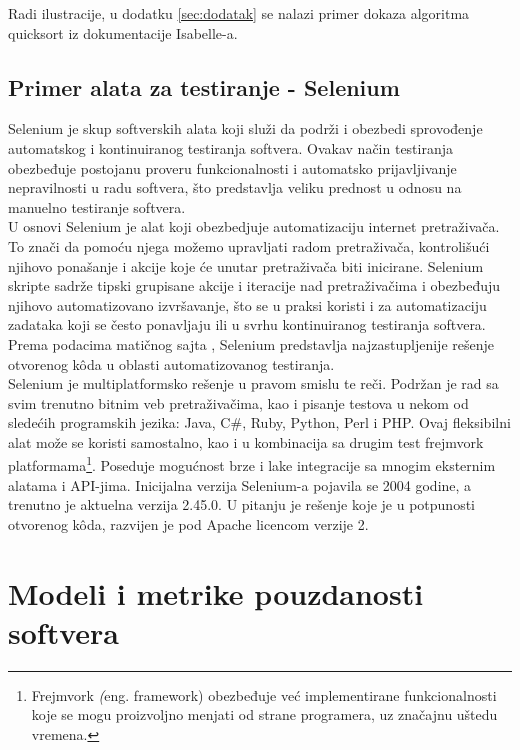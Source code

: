 \documentclass[a4paper]{article}
\begin{document}
Radi ilustracije, u dodatku \ref{sec:dodatak} se nalazi primer dokaza algoritma quicksort iz dokumentacije Isabelle-a.


\subsection{Primer alata za testiranje - Selenium}
\label{subsec:primer_alata}
Selenium je skup softverskih alata koji služi da podrži i obezbedi sprovođenje automatskog i kontinuiranog testiranja softvera. Ovakav način testiranja obezbeđuje postojanu proveru funkcionalnosti i automatsko prijavljivanje nepravilnosti u radu softvera, što predstavlja veliku prednost u odnosu na manuelno testiranje softvera.\\

U osnovi Selenium je alat koji obezbedjuje automatizaciju internet pretraživača. To znači da pomoću njega možemo upravljati radom pretraživača, kontrolišući njihovo ponašanje i akcije koje će unutar pretraživača biti inicirane. Selenium skripte sadrže tipski grupisane akcije i iteracije nad pretraživačima i obezbeđuju njihovo automatizovano izvršavanje, što se u praksi koristi i za automatizaciju zadataka koji se često ponavljaju ili u svrhu kontinuiranog testiranja softvera. Prema podacima matičnog sajta \cite{Selenium}, Selenium predstavlja najzastupljenije rešenje otvorenog  k\^{o}da u oblasti automatizovanog testiranja.\\

Selenium je multiplatformsko rešenje u pravom smislu te reči. Podržan je rad sa svim trenutno bitnim veb pretraživačima, kao i pisanje testova u nekom od sledećih programskih jezika: Java, C\#, Ruby, Python, Perl i PHP. Ovaj fleksibilni alat može se koristi samostalno, kao i u kombinacija sa drugim test frejmvork platformama\footnote{ Frejmvork \emph(eng. framework) obezbeđuje već implementirane funkcionalnosti koje se mogu proizvoljno menjati od strane programera, uz značajnu uštedu vremena.}. Poseduje mogućnost brze i lake integracije sa mnogim eksternim alatama i API-jima. Inicijalna verzija Selenium-a pojavila se 2004 godine, a trenutno je aktuelna verzija 2.45.0. U pitanju je rešenje koje je u potpunosti otvorenog  k\^{o}da, razvijen je pod Apache licencom verzije 2.

\section{Modeli i metrike pouzdanosti softvera}	
\label{sec:modeli_metrike}
\end{document}

